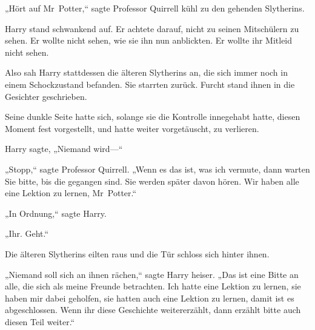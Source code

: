 „Hört auf Mr~Potter,“ sagte Professor Quirrell kühl zu den gehenden Slytherins.

Harry stand schwankend auf. Er achtete darauf, nicht zu seinen Mitschülern zu sehen. Er wollte nicht sehen, wie sie ihn nun anblickten. Er wollte ihr Mitleid nicht sehen.

Also sah Harry stattdessen die älteren Slytherins an, die sich immer noch in einem Schockzustand befanden. Sie starrten zurück. Furcht stand ihnen in die Gesichter geschrieben.

Seine dunkle Seite hatte sich, solange sie die Kontrolle innegehabt hatte, diesen Moment fest vorgestellt, und hatte weiter vorgetäuscht, zu verlieren.

Harry sagte, „Niemand wird—“

„Stopp,“ sagte Professor Quirrell. „Wenn es das ist, was ich vermute, dann warten Sie bitte, bis die gegangen sind. Sie werden später davon hören. Wir haben alle eine Lektion zu lernen, Mr~Potter.“

„In Ordnung,“ sagte Harry.

„Ihr. Geht.“

Die älteren Slytherins eilten raus und die Tür schloss sich hinter ihnen.

„Niemand soll sich an ihnen rächen,“ sagte Harry heiser. „Das ist eine Bitte an alle, die sich als meine Freunde betrachten. Ich hatte eine Lektion zu lernen, sie haben mir dabei geholfen, sie hatten auch eine Lektion zu lernen, damit ist es abgeschlossen. Wenn ihr diese Geschichte weitererzählt, dann erzählt bitte auch diesen Teil weiter.“

